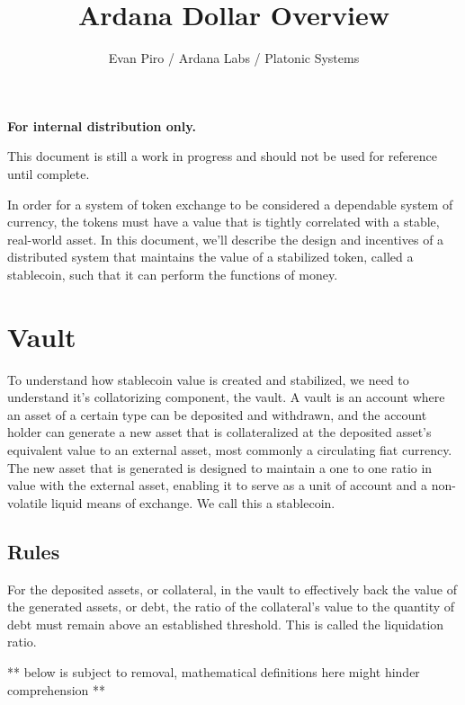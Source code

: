 \documentclass[12pt]{article}
\title{Ardana Dollar Overview}
\author{Evan Piro / Ardana Labs / Platonic Systems}
\begin{document}
\maketitle

\begin{center}
	\textbf{For internal distribution only.}
\end{center}

\begin{center}
	\color{red} This document is still a work in progress and should not be used for reference until complete.
\end{center}



In order for a system of token exchange to be considered a dependable system of currency, the tokens must have a value that is tightly correlated with a stable, real-world asset. In this document, we'll describe the design and incentives of a distributed system that maintains the value of a stabilized token, called a stablecoin, such that it can perform the functions of money.

\section{Vault}

To understand how stablecoin value is created and stabilized, we need to understand it's collatorizing component, the vault. A vault is an account where an asset of a certain type can be deposited and withdrawn, and the account holder can generate a new asset that is collateralized at the deposited asset's equivalent value to an external asset, most commonly a circulating fiat currency. The new asset that is generated is designed to maintain a one to one ratio in value with the external asset, enabling it to serve as a unit of account and a non-volatile liquid means of exchange. We call this a stablecoin.

\subsection{Rules}

For the deposited assets, or collateral, in the vault to effectively back the value of the generated assets, or debt, the ratio of the collateral's value to the quantity of debt must remain above an established threshold. This is called the liquidation ratio.

** below is subject to removal, mathematical definitions here might hinder comprehension **
\end{document}
